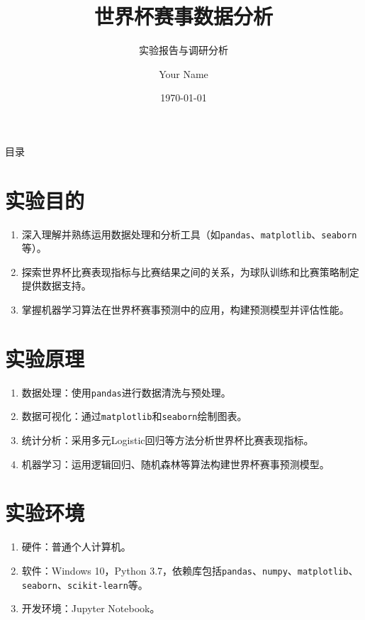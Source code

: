 \documentclass{beamer}
\title{世界杯赛事数据分析}
\subtitle{实验报告与调研分析}
\author{Your Name}
\institute{Your Institution}
\date{\today}
\begin{document}
	
	\begin{frame}
		\titlepage
	\end{frame}
	
	\begin{frame}{目录}
		\tableofcontents
	\end{frame}
	
	\section{实验目的}
	\begin{frame}
		\begin{enumerate}[label=\arabic*.]
			\item 深入理解并熟练运用数据处理和分析工具（如\texttt{pandas}、\texttt{matplotlib}、\texttt{seaborn}等）。
			\item 探索世界杯比赛表现指标与比赛结果之间的关系，为球队训练和比赛策略制定提供数据支持。
			\item 掌握机器学习算法在世界杯赛事预测中的应用，构建预测模型并评估性能。
		\end{enumerate}
	\end{frame}
	
	\section{实验原理}
	\begin{frame}
		\begin{enumerate}[label=\arabic*.]
			\item 数据处理：使用\texttt{pandas}进行数据清洗与预处理。
			\item 数据可视化：通过\texttt{matplotlib}和\texttt{seaborn}绘制图表。
			\item 统计分析：采用多元Logistic回归等方法分析世界杯比赛表现指标。
			\item 机器学习：运用逻辑回归、随机森林等算法构建世界杯赛事预测模型。
		\end{enumerate}
	\end{frame}
	
	\section{实验环境}
	\begin{frame}
		\begin{enumerate}[label=\arabic*.]
			\item 硬件：普通个人计算机。
			\item 软件：Windows 10，Python 3.7，依赖库包括\texttt{pandas}、\texttt{numpy}、\texttt{matplotlib}、\texttt{seaborn}、\texttt{scikit-learn}等。
			\item 开发环境：Jupyter Notebook。
		\end{enumerate}
	\end{frame}
	
\end{document}
